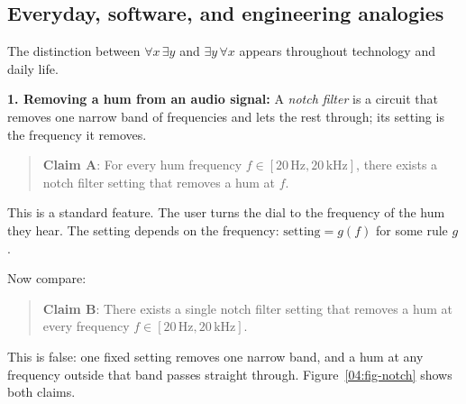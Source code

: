 \subsection{Everyday, software, and engineering analogies}

The distinction between $\forall x \, \exists y$ and $\exists y \, \forall x$ appears throughout technology and daily life.

\textbf{1. Removing a hum from an audio signal:} A \emph{notch filter} is a circuit that removes one narrow band of frequencies and lets the rest through; its setting is the frequency it removes.
\begin{quote}
\textbf{Claim A}: For every hum frequency $f \in [20\,\text{Hz}, 20\,\text{kHz}]$, there exists a notch filter setting that removes a hum at $f$.
\end{quote}
This is a standard feature. The user turns the dial to the frequency of the hum they hear. The setting depends on the frequency: $\text{setting} = g(f)$ for some rule $g$.

Now compare:
\begin{quote}
\textbf{Claim B}: There exists a single notch filter setting that removes a hum at every frequency $f \in [20\,\text{Hz}, 20\,\text{kHz}]$.
\end{quote}
This is false: one fixed setting removes one narrow band, and a hum at any frequency outside that band passes straight through. Figure~\ref{04:fig-notch} shows both claims.

